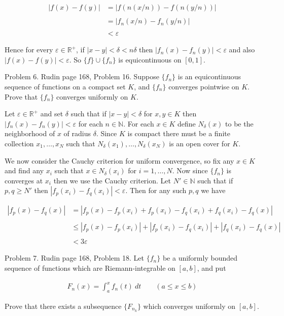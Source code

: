 \documentclass{article}
\begin{document}
  \begin{align*}
    |f(x)-f(y)|&=|f(n(x/n))-f(n(y/n))| \\\\
    &= |f_n(x/n)-f_n(y/n)| \\\\ 
    & <\varepsilon
  \end{align*}

  Hence for every $\varepsilon\in\mathbb R^+$, if $|x-y|<\delta<n\delta$ then $|f_n(x)-f_n(y)|<\varepsilon$ and also $|f(x)-f(y)|<\varepsilon$.  So $\{f\}\cup\{f_n\}$ is equicontinuous on $[0,1]$.  

\pagebreak
  
  {\Large \color{Sepia} Problem 6. Rudin page 168, Problem 16. Suppose $\{f_n\}$ is an equicontinuous sequence of functions on a compact set $K$, and $\{f_n\}$ converges pointwise on $K$.  Prove that $\{f_n\}$ converges uniformly on $K$.}

  \vspace{1cm} 

  Let $\varepsilon\in\mathbb R^+$ and set $\delta$ such that if $|x-y|<\delta$ for $x,y\in K$ then $|f_n(x)-f_n(y)|<\varepsilon$ for each $n\in\mathbb N$.  For each $x\in K$ define $N_\delta(x)$ to be the neighborhood of $x$ of radius $\delta$.  Since $K$ is compact there must be a finite collection $x_1,\dots,x_N$ such that $N_\delta(x_1),\dots,N_\delta(x_N)$  is an open cover for $K$.  

  We now consider the Cauchy criterion for uniform convergence, so fix any $x\in K$ and find any $x_i$ such that $x\in N_\delta(x_i)$ for $i=1,\dots,N$.  Now since $\{f_n\}$ is converges at $x_i$ then we use the Cauchy criterion.  Let $N'\in\mathbb N$ such that if $p,q\ge N'$ then $|f_p(x_i)-f_q(x_i)|<\varepsilon$.  Then for any such $p,q$ we have 

  \begin{align*}
    |f_p(x)-f_q(x)| &= |f_p(x)-f_p(x_i)+f_p(x_i)-f_q(x_i)+f_q(x_i)-f_q(x)| \\\\
    &\le |f_p(x)-f_p(x_i)|+|f_p(x_i)-f_q(x_i)|+|f_q(x_i)-f_q(x)| \\\\
    &< 3\varepsilon
  \end{align*}

\pagebreak
  
  {\Large \color{Sepia} Problem 7. Rudin page 168, Problem 18. Let $\{f_n\}$ be a uniformly bounded sequence of functions which are Riemann-integrable on $[a,b]$, and put 

  \begin{align*}
      F_n(x) = \int_a^x f_n(t)\ dt \qquad (a\le x\le b)
  \end{align*}

  Prove that there exists a subsequence $\{F_{n_k}\}$ which converges uniformly on $[a,b]$.  }
\end{document}
